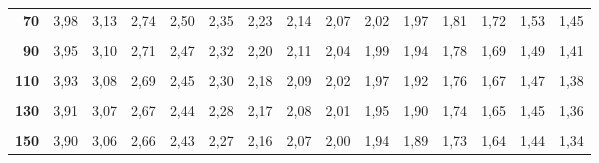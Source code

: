 \documentclass[
  11pt,
  ngerman,
  a4paper,
]{report}
\begin{document}
\begin{table}[H]
{\begin{tabular}{>{}r|rrrrrrrrrrrrrr}
\textbf{70} & 3,98 & 3,13 & 2,74 & 2,50 & 2,35 & 2,23 & 2,14 & 2,07 & 2,02 & 1,97 & 1,81 & 1,72 & 1,53 & 1,45\\
\textbf{\cellcolor{gray!6}{80}} & \cellcolor{gray!6}{3,96} & \cellcolor{gray!6}{3,11} & \cellcolor{gray!6}{2,72} & \cellcolor{gray!6}{2,49} & \cellcolor{gray!6}{2,33} & \cellcolor{gray!6}{2,21} & \cellcolor{gray!6}{2,13} & \cellcolor{gray!6}{2,06} & \cellcolor{gray!6}{2,00} & \cellcolor{gray!6}{1,95} & \cellcolor{gray!6}{1,79} & \cellcolor{gray!6}{1,70} & \cellcolor{gray!6}{1,51} & \cellcolor{gray!6}{1,43}\\
\textbf{90} & 3,95 & 3,10 & 2,71 & 2,47 & 2,32 & 2,20 & 2,11 & 2,04 & 1,99 & 1,94 & 1,78 & 1,69 & 1,49 & 1,41\\
\addlinespace
\textbf{\cellcolor{gray!6}{100}} & \cellcolor{gray!6}{3,94} & \cellcolor{gray!6}{3,09} & \cellcolor{gray!6}{2,70} & \cellcolor{gray!6}{2,46} & \cellcolor{gray!6}{2,31} & \cellcolor{gray!6}{2,19} & \cellcolor{gray!6}{2,10} & \cellcolor{gray!6}{2,03} & \cellcolor{gray!6}{1,97} & \cellcolor{gray!6}{1,93} & \cellcolor{gray!6}{1,77} & \cellcolor{gray!6}{1,68} & \cellcolor{gray!6}{1,48} & \cellcolor{gray!6}{1,39}\\
\textbf{110} & 3,93 & 3,08 & 2,69 & 2,45 & 2,30 & 2,18 & 2,09 & 2,02 & 1,97 & 1,92 & 1,76 & 1,67 & 1,47 & 1,38\\
\textbf{\cellcolor{gray!6}{120}} & \cellcolor{gray!6}{3,92} & \cellcolor{gray!6}{3,07} & \cellcolor{gray!6}{2,68} & \cellcolor{gray!6}{2,45} & \cellcolor{gray!6}{2,29} & \cellcolor{gray!6}{2,18} & \cellcolor{gray!6}{2,09} & \cellcolor{gray!6}{2,02} & \cellcolor{gray!6}{1,96} & \cellcolor{gray!6}{1,91} & \cellcolor{gray!6}{1,75} & \cellcolor{gray!6}{1,66} & \cellcolor{gray!6}{1,46} & \cellcolor{gray!6}{1,37}\\
\textbf{130} & 3,91 & 3,07 & 2,67 & 2,44 & 2,28 & 2,17 & 2,08 & 2,01 & 1,95 & 1,90 & 1,74 & 1,65 & 1,45 & 1,36\\
\textbf{\cellcolor{gray!6}{140}} & \cellcolor{gray!6}{3,91} & \cellcolor{gray!6}{3,06} & \cellcolor{gray!6}{2,67} & \cellcolor{gray!6}{2,44} & \cellcolor{gray!6}{2,28} & \cellcolor{gray!6}{2,16} & \cellcolor{gray!6}{2,08} & \cellcolor{gray!6}{2,01} & \cellcolor{gray!6}{1,95} & \cellcolor{gray!6}{1,90} & \cellcolor{gray!6}{1,74} & \cellcolor{gray!6}{1,65} & \cellcolor{gray!6}{1,44} & \cellcolor{gray!6}{1,35}\\
\addlinespace
\textbf{150} & 3,90 & 3,06 & 2,66 & 2,43 & 2,27 & 2,16 & 2,07 & 2,00 & 1,94 & 1,89 & 1,73 & 1,64 & 1,44 & 1,34\\

\end{tabular}}
\end{table}
\end{document}
